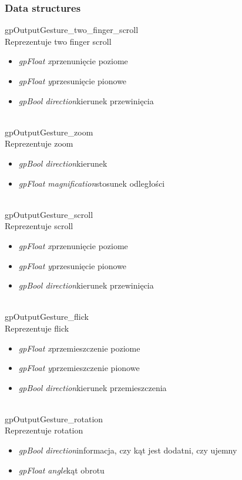 \subsubsection{Data structures}
\textsf{gpOutputGesture_two_finger_scroll} \\ \indent Reprezentuje two finger scroll
	\begin{itemize}
		\item \textit{gpFloat x}\quad przenunięcie poziome
		\item \textit{gpFloat y}\quad przesunięcie pionowe
		\item \textit{gpBool direction}\quad kierunek przewinięcia
	\end{itemize}
\ \\
\textsf{gpOutputGesture_zoom} \\ \indent Reprezentuje zoom
	\begin{itemize}
		\item \textit{gpBool direction}\quad kierunek
		\item \textit{gpFloat magnification}\quad stosunek odległości
	\end{itemize}
\ \\
\textsf{gpOutputGesture_scroll} \\ \indent Reprezentuje scroll
	\begin{itemize}
		\item \textit{gpFloat x}\quad przenunięcie poziome
		\item \textit{gpFloat y}\quad przesunięcie pionowe
		\item \textit{gpBool direction}\quad kierunek przewinięcia
	\end{itemize}
\ \\
\textsf{gpOutputGesture_flick} \\ \indent Reprezentuje flick
	\begin{itemize}
		\item \textit{gpFloat x}\quad przemieszczenie poziome
		\item \textit{gpFloat y}\quad przemieszczenie pionowe
		\item \textit{gpBool direction}\quad kierunek przemieszczenia
	\end{itemize}
\ \\
\textsf{gpOutputGesture_rotation} \\ \indent Reprezentuje rotation
	\begin{itemize}
		\item \textit{gpBool direction}\quad informacja, czy kąt jest dodatni, czy ujemny
		\item \textit{gpFloat angle}\quad kąt obrotu
	\end{itemize}
